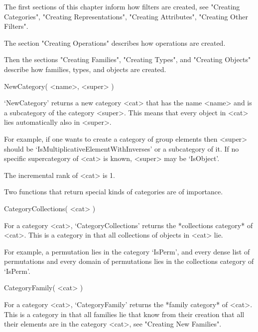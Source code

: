 

The first sections of this chapter inform how filters are created,
see "Creating Categories", "Creating Representations",
"Creating Attributes", "Creating Other Filters".

The section "Creating Operations" describes how operations
are created.

Then the sections "Creating Families", "Creating Types",
and "Creating Objects" describe how families, types,
and objects are created.



\>NewCategory( <name>, <super> )

`NewCategory' returns a new category <cat> that has the name <name> and
is a subcategory of the category <super>.
This means that every object in <cat> lies automatically also in <super>.

For example, if one wants to create a category of group elements
then <super> should be `IsMultiplicativeElementWithInverses' or a
subcategory of it.
If no specific supercategory of <cat> is known,
<super> may be `IsObject'.

The incremental rank of <cat> is 1.

Two functions that return special kinds of categories are of importance.

\>CategoryCollections( <cat> )

For a category <cat>,
`CategoryCollections' returns the *collections category* of <cat>.
This is a category in that all collections of objects in <cat> lie.

For example, a permutation lies in the category `IsPerm',
and every dense list of permutations and every domain of permutations
lies in the collections category of `IsPerm'.

\>CategoryFamily( <cat> )

For a category <cat>,
`CategoryFamily' returns the *family category* of <cat>.
This is a category in that all families lie that know from their
creation that all their elements are in the category <cat>,
see "Creating New Families".

